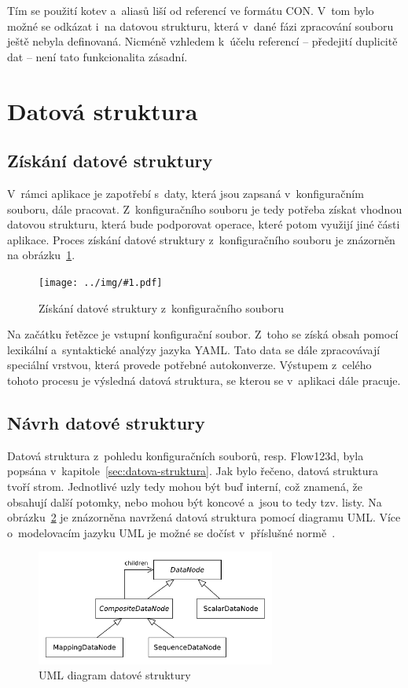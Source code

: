 \documentclass[FM,bw,DP]{tulthesis}
\newcommand{\includeimg}[2]{%
\begin{figure}[h]
	\centering
    \texttt{[image: ../img/\#1.pdf]}
    \caption{#2}
	\label{img:#1}
\end{figure}
}
\begin{document}
Tím se použití kotev a~aliasů liší od referencí ve formátu \gls{CON}. V~tom bylo možné se odkázat i~na datovou strukturu, která v~dané fázi zpracování souboru ještě nebyla definovaná. Nicméně vzhledem k~účelu referencí -- předejití duplicitě dat -- není tato funkcionalita zásadní. 



\section{Datová struktura}

\subsection{Získání datové struktury}

V~rámci aplikace je zapotřebí s~daty, která jsou zapsaná v~konfiguračním souboru, dále pracovat. Z~konfiguračního souboru je tedy potřeba získat vhodnou datovou strukturu, která bude podporovat operace, které potom využijí jiné části aplikace. Proces získání datové struktury z~konfiguračního souboru je znázorněn na obrázku~\ref{img:data_structure_chain}.

\includeimg{data_structure_chain}{Získání datové struktury z~konfiguračního souboru}

Na začátku řetězce je vstupní konfigurační soubor. Z~toho se získá obsah pomocí lexikální a~syntaktické analýzy jazyka \gls{YAML}. Tato data se dále zpracovávají speciální vrstvou, která provede potřebné autokonverze. Výstupem z~celého tohoto procesu je výsledná datová struktura, se kterou se v~aplikaci dále pracuje.

\subsection{Návrh datové struktury}

Datová struktura z~pohledu konfiguračních souborů, resp. Flow123d, byla popsána v~kapitole~\ref{sec:datova-struktura}. Jak bylo řečeno, datová struktura tvoří strom. Jednotlivé uzly tedy mohou být buď interní, což znamená, že obsahují další potomky, nebo mohou být koncové a~jsou to tedy tzv. listy. Na obrázku~\ref{img:data_node} je znázorněna navržená datová struktura pomocí diagramu \gls{UML}. Více o~modelovacím jazyku \gls{UML} je možné se dočíst v~příslušné normě~\cite{bib:uml}.

\begin{figure}[h]
	\centering
    \includegraphics[width=0.7\textwidth]{../img/data_node.pdf}
    \caption{UML diagram datové struktury}
	\label{img:data_node}
\end{figure}
\end{document}
